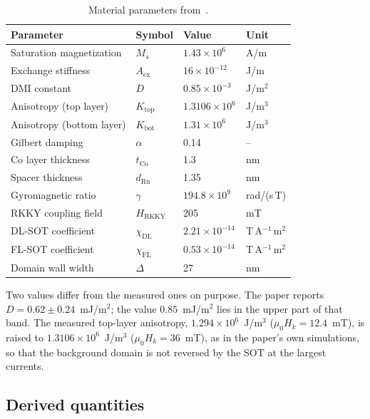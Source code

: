 \documentclass[11pt,a4paper]{article}
\newcommand{\tCo}{t_{\text{Co}}}
\newcommand{\Aex}{A_{\text{ex}}}
\newcommand{\Ms}{M_s}
\begin{document}
\begin{table}[H]
\centering
\caption{Material parameters from~\cite{pham2024}.}
\begin{tabular}{@{}llll@{}}
\toprule
Parameter & Symbol & Value & Unit \\
\midrule
Saturation magnetization
    & $\Ms$ & $1.43 \times 10^6$ & A/m \\
Exchange stiffness
    & $\Aex$ & $16 \times 10^{-12}$ & J/m \\
DMI constant
    & $D$ & $0.85 \times 10^{-3}$ & J/m$^2$ \\
Anisotropy (top layer)
    & $K_{\text{top}}$ & $1.3106 \times 10^6$ & J/m$^3$ \\
Anisotropy (bottom layer)
    & $K_{\text{bot}}$ & $1.31 \times 10^6$ & J/m$^3$ \\
Gilbert damping
    & $\alpha$ & 0.14 & -- \\
Co layer thickness
    & $\tCo$ & 1.3 & nm \\
Spacer thickness
    & $d_{\text{Ru}}$ & 1.35 & nm \\
Gyromagnetic ratio
    & $\gamma$ & $194.8 \times 10^9$ & rad/(s\,T) \\
RKKY coupling field
    & $H_{\text{RKKY}}$ & 205 & mT \\
DL-SOT coefficient
    & $\chi_{\text{DL}}$
    & $2.21 \times 10^{-14}$
    & T\,A$^{-1}$\,m$^2$ \\
FL-SOT coefficient
    & $\chi_{\text{FL}}$
    & $0.53 \times 10^{-14}$
    & T\,A$^{-1}$\,m$^2$ \\
Domain wall width
    & $\Delta$ & 27 & nm \\
\bottomrule
\end{tabular}
\end{table}

Two values differ from the measured ones on purpose.  The paper
reports $D = 0.62 \pm 0.24$~mJ/m$^2$; the value $0.85$~mJ/m$^2$ lies
in the upper part of that band.  The measured top-layer anisotropy,
$1.294 \times 10^6$~J/m$^3$ ($\mu_0 H_k = 12.4$~mT), is raised to
$1.3106 \times 10^6$~J/m$^3$ ($\mu_0 H_k = 36$~mT), as in the
paper's own simulations, so that the background domain is not
reversed by the SOT at the largest currents.

\subsection*{Derived quantities}
\end{document}
